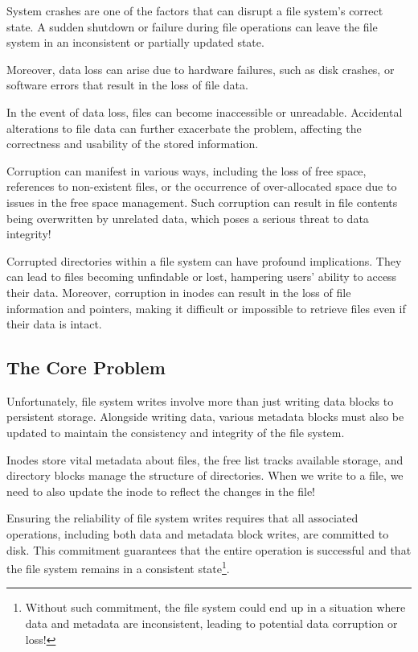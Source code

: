 \documentclass{report}
\newcommand{\exampleBegin}[1]{\begin{tcolorbox}[colback=blue!5!white,colframe=black!75!blue,title={Example:
      #1}]}
\newcommand{\exampleEnd}{\end{tcolorbox}}
\begin{document}
System crashes are one of the factors that can disrupt a file system's correct state. A sudden
shutdown or failure during file operations can leave the file system in an inconsistent or partially
updated state.

Moreover, data loss can arise due to hardware failures, such as disk crashes, or software errors
that result in the loss of file data.

In the event of data loss, files can become inaccessible or unreadable. Accidental alterations to
file data can further exacerbate the problem, affecting the correctness and usability of the stored
information.

Corruption can manifest in various ways, including the loss of free space, references to
non-existent files, or the occurrence of over-allocated space due to issues in the free space
management. Such corruption can result in file contents being overwritten by unrelated data, which
poses a serious threat to data integrity!

Corrupted directories within a file system can have profound implications. They can lead to files
becoming unfindable or lost, hampering users' ability to access their data. Moreover, corruption in
inodes can result in the loss of file information and pointers, making it difficult or impossible to
retrieve files even if their data is intact.


\subsection{The Core Problem}
Unfortunately, file system writes involve more than just writing data blocks to persistent
storage. Alongside writing data, various metadata blocks must also be updated to maintain the
consistency and integrity of the file system.

\exampleBegin{Meta Metadata}
Inodes store vital metadata about files, the free list tracks available storage, and directory
blocks manage the structure of directories. When we write to a file, we need to also update the
inode to reflect the changes in the file!
\exampleEnd

Ensuring the reliability of file system writes requires that all associated operations, including
both data and metadata block writes, are committed to disk. This commitment guarantees that the
entire operation is successful and that the file system remains in a consistent state\footnote{Without such
commitment, the file system could end up in a situation where data and metadata are inconsistent,
leading to potential data corruption or loss!}.
\end{document}
